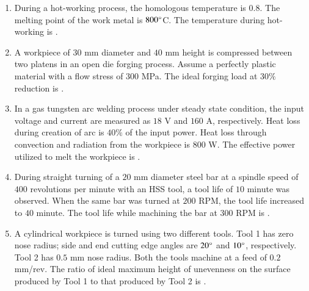 \documentclass[journal,12pt,onecolumn]{IEEEtran}
\theoremstyle{remark}
\begin{document}
\begin{enumerate}
    \hfill{}

    \item During a hot-working process, the homologous temperature is $0.8$. The melting point of the work metal is $800\degree$C. The temperature  during hot-working is \underline{\hspace{2cm}}.

    \hfill{}

    \item A workpiece of $30$ mm diameter and $40$ mm height is compressed between two platens in an open die forging process. Assume a perfectly plastic material with a flow stress of $300$ MPa. The ideal forging load  at $30\%$ reduction  is \underline{\hspace{2cm}}.

    \hfill{}

    \item In a gas tungsten arc welding process under steady state condition, the input voltage and current are measured as $18$ V and $160$ A, respectively. Heat loss during creation of arc is $40\%$ of the input power. Heat loss through convection and radiation from the workpiece is $800$ W. The effective power  utilized to melt the workpiece is \underline{\hspace{2cm}}.

    \hfill{}

    \item During straight turning of a $20$ mm diameter steel bar at a spindle speed of $400$ revolutions per minute  with an HSS tool, a tool life of $10$ minute was observed. When the same bar was turned at $200$ RPM, the tool life increased to $40$ minute. The tool life  while machining the bar at $300$ RPM is \underline{\hspace{2cm}}.

    \hfill{}

    \item A cylindrical workpiece is turned using two different tools. Tool 1 has zero nose radius; side and end cutting edge angles are $20\degree$ and $10\degree$, respectively. Tool 2 has $0.5$ mm nose radius. Both the tools machine at a feed of $0.2$ mm/rev. The ratio of ideal maximum height of unevenness on the surface produced by Tool 1 to that produced by Tool 2 is \underline{\hspace{2cm}}.


\end{enumerate}
\end{document}
